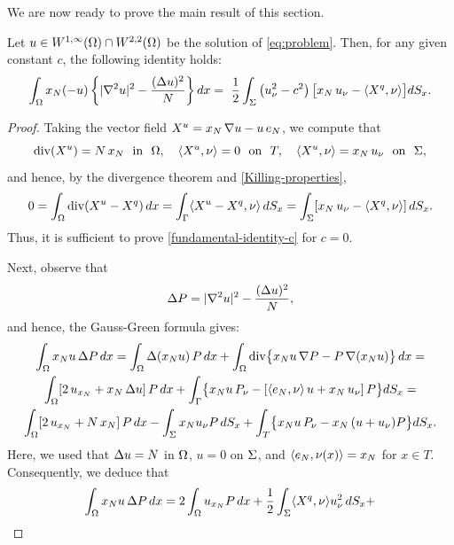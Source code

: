\documentclass[a4paper,10pt]{amsart}
\numberwithin{equation}{section}
\begin{document}
We are now ready to prove the main result of this section.

\begin{thm}
\label{th:fundamental-identity-c}
Let $u\in W^{1,\infty}(\Omega) \cap W^{2,2} (\Omega)$ be the solution of \eqref{eq:problem}. Then, for any given constant $c$, the following identity  holds:
\begin{equation}
\label{fundamental-identity-c}
\int_\Omega x_N (-u) \left\{ | \nabla^2 u|^2- \frac{(\Delta u)^2}{N} \right\} dx = \
\frac{1}{2} \int_\Sigma \left( u_\nu^2 - c^2 \right) \bigl[ x_N\,u_\nu - \langle X^q, \nu\rangle \bigr]  dS_x.
\end{equation}
\end{thm}
\begin{proof}
Taking the vector field $X^u=x_N\,\nabla u-u\,e_N$, we compute that
\begin{equation}
	\label{Xu-properties}
	\mathop{\mathrm{div}}(X^u)=N\,x_N \ \mbox{ in } \ \Omega, \quad \langle X^u, \nu\rangle=0 \ \mbox{ on } \ T, \quad
	\langle X^u, \nu\rangle=x_N\,u_\nu \ \mbox{ on } \ \Sigma ,
\end{equation}	
and hence, by the divergence theorem and \eqref{Killing-properties}, 
$$
0=\int_\Omega\mathop{\mathrm{div}}( X^u - X^q )\,dx=\int_\Gamma\langle X^u -  X^q , \nu\rangle\,dS_x=
\int_\Sigma [x_N\,u_\nu-\langle X^q,\nu\rangle]\,dS_x .
$$
Thus, it is sufficient to prove \eqref{fundamental-identity-c} for $c=0$.
\par
Next, observe that
\begin{equation*}
\Delta P = | \nabla^2 u|^2 -  \frac{(\Delta u)^2}{N},
\end{equation*}
and hence, the Gauss-Green formula gives:
\begin{multline*}
\int_\Omega x_N u\, \Delta P \, dx =\int_\Omega \Delta (x_N u)\,P\,dx+\int_\Omega \mathop{\mathrm{div}}\bigl\{ x_N u\,\nabla P-P\,\nabla (x_N u)\bigr\}\,dx=
\\
\int_\Omega [2\,u_{x_N}+x_N\,\Delta u]\,P\,dx + \int_\Gamma \bigl\{ x_N u\,P_\nu-[\langle e_N,\nu\rangle\,u+x_N\,u_\nu]\,P\bigr\} dS_x= \\
\int_\Omega [2\,u_{x_N}+N\,x_N]\,P\,dx -\int_\Sigma x_N u_\nu P \, dS_x
+\int_T \bigl\{ x_N u \, P_\nu-x_N\,(u+u_\nu) P  \bigr\}  dS_x.
\end{multline*}
Here, we used that $\Delta u=N$ in $\Omega$, $u=0$ on $\Sigma$, and $\langle e_N,\nu(x)\rangle=x_N$ for $x\in T$. 
Consequently, we deduce that
\begin{multline*}
\int_\Om x_N u\, \De P \, dx =
2 \int_\Om u_{x_N}  P \, dx + \frac{1}{2} \int_\Si \lan X^q, \nu\ran u_{\nu}^2 \, dS_x+\\

\end{multline*}
\end{proof}
\end{document}
